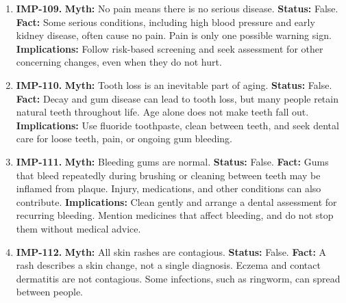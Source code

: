 \documentclass[11pt,oneside]{book}
\begin{document}
\begin{enumerate}[leftmargin=0pt,labelwidth=0pt,labelsep=0pt,itemindent=0pt]
\textbf{Status:} False.\newline
\textbf{Fact:} Pain can accompany actual or threatened injury. It can also persist because the nervous system has become more sensitive. Its intensity is not a direct measurement of tissue damage. \cite{ref234}\newline
\textbf{Implications:} Use changes in symptoms, function, examination, and injury history to guide activity and treatment.
\item[] \textbf{IMP-109.} \textbf{Myth:} No pain means there is no serious disease.\newline
\textbf{Status:} False.\newline
\textbf{Fact:} Some serious conditions, including high blood pressure and early kidney disease, often cause no pain. Pain is only one possible warning sign. \cite{ref267,ref272}\newline
\textbf{Implications:} Follow risk-based screening and seek assessment for other concerning changes, even when they do not hurt.
\item[] \textbf{IMP-110.} \textbf{Myth:} Tooth loss is an inevitable part of aging.\newline
\textbf{Status:} False.\newline
\textbf{Fact:} Decay and gum disease can lead to tooth loss, but many people retain natural teeth throughout life. Age alone does not make teeth fall out. \cite{ref235}\newline
\textbf{Implications:} Use fluoride toothpaste, clean between teeth, and seek dental care for loose teeth, pain, or ongoing gum bleeding.
\item[] \textbf{IMP-111.} \textbf{Myth:} Bleeding gums are normal.\newline
\textbf{Status:} False.\newline
\textbf{Fact:} Gums that bleed repeatedly during brushing or cleaning between teeth may be inflamed from plaque. Injury, medications, and other conditions can also contribute. \cite{ref236}\newline
\textbf{Implications:} Clean gently and arrange a dental assessment for recurring bleeding. Mention medicines that affect bleeding, and do not stop them without medical advice.
\item[] \textbf{IMP-112.} \textbf{Myth:} All skin rashes are contagious.\newline
\textbf{Status:} False.\newline
\textbf{Fact:} A rash describes a skin change, not a single diagnosis. Eczema and contact dermatitis are not contagious. Some infections, such as ringworm, can spread between people. \cite{ref440}\newline

\end{enumerate}
\end{document}
